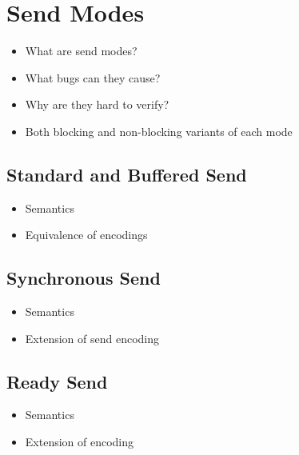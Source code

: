 \section{Send Modes}

\begin{itemize}
\item What are send modes?
\item What bugs can they cause?
\item Why are they hard to verify?
\item Both blocking and non-blocking variants of each mode
\end{itemize}

\subsection{Standard and Buffered Send}
\begin{itemize}
\item Semantics
\item Equivalence of encodings
\end{itemize}

\subsection{Synchronous Send}
\begin{itemize}
\item Semantics
\item Extension of send encoding
\end{itemize}

\subsection{Ready Send}
\begin{itemize}
\item Semantics
\item Extension of encoding
\end{itemize}

